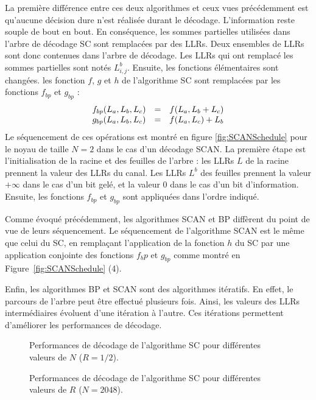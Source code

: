La première différence entre ces deux algorithmes et ceux vues précédemment est qu'aucune décision dure n'est réalisée durant le décodage. L'information reste souple de bout en bout.
En conséquence, les sommes partielles utilisées dans l'arbre de décodage SC sont remplacées par des LLRs. Deux ensembles de LLRs sont donc contenues dans l'arbre de décodage. Les LLRs qui ont remplacé les sommes partielles sont notés $L^b_{i,j}$.
Ensuite, les fonctions élémentaires sont changées. les fonction $f$, $g$ et $h$ de l'algorithme SC sont remplacées par les fonctions $f_{bp}$ et $g_{bp}$ :
\begin{eqnarray}
  \begin{array}{l c l}
    f_{bp}(L_a,L_b,L_c) & = & f(L_a, L_b  + L_c) \\
    g_{bp}(L_a,L_b,L_c) & = & f(L_a, L_c) + L_b
  \end{array}
  \label{eq:bp}
\end{eqnarray}
Le séquencement de ces opérations est montré en figure \ref{fig:SCANSchedule} pour le noyau de taille $N=2$ dans le cas d'un décodage SCAN. La première étape est l'initialisation de la racine et des feuilles de l'arbre : les LLRs $L$ de la racine prennent la valeur des LLRs du canal. Les LLRs $L^b$ des feuilles prennent la valeur $+\infty$ dans le cas d'un bit gelé, et la valeur $0$ dans le cas d'un bit d'information. Ensuite, les fonctions $f_{bp}$ et $g_{bp}$ sont appliquées dans l'ordre indiqué.

Comme évoqué précédemment, les algorithmes SCAN et BP diffèrent du point de vue de leurs séquencement. Le séquencement de l'algorithme SCAN est le même que celui du SC, en remplaçant l'application de la fonction $h$ du SC par une application conjointe des fonctions ${f_bp}$ et $g_{bp}$ comme montré en Figure~\ref{fig:SCANSchedule} (4).

Enfin, les algorithmes BP et SCAN sont des algorithmes itératifs. En effet, le parcours de l'arbre peut être effectué plusieurs fois. Ainsi, les valeurs des LLRs intermédiaires évoluent d'une itération à l'autre. Ces itérations permettent d'améliorer les performances de décodage.

\begin{figure}[h]
  \centering

\caption{Performances de décodage de l'algorithme SC pour différentes valeurs de $N$ ($R=1/2$).}
\label{fig:sc_n}
\end{figure}

\begin{figure}[h]
  \centering

\caption{Performances de décodage de l'algorithme SC pour différentes valeurs de $R$ ($N=2048$).}
\label{fig:sc_r}
\end{figure}
\clearpage
